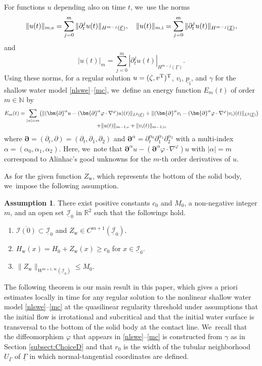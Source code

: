 \documentclass[JEP,XML,SOM,Unicode,NoFloatCountersInSection,published]{cedram}
\newenvironment{enumeratei}
{\bgroup\def\theenumi{\roman{enumi}}\def\theenumii{\arabic{enumii}}\begin{enumerate}}
{\end{enumerate}\egroup}
\newcommand{\R}{{\mathbb R}}
\newcommand{\dt}{\partial_t}
\newcommand{\cI}{{\mathcal I}}
\newcommand{\cE}{{\mathcal E}}
\newcommand{\ul}[1]{\underline{#1}}
\newcommand{\itGamma}{\mathit{\Gamma}}
\theoremstyle{definition}
\newtheorem{assumption}[theorem]{Assumption}
\begin{document}
For functions $u$ depending also on time $t$, we~use the norms
\[
\|u(t)\|_{m,{\rm e}}=\sum_{j=0}^m \|\dt^j u (t)\|_{H^{m-j}(\ul{\cE})}, \quad
\|u(t)\|_{m,{\rm i}}=\sum_{j=0}^m \|\dt^j u (t)\|_{H^{m-j}(\ul{\cI})},
\]
and
\[
|u(t)|_m = \sum_{j=0}^m |\dt^j u(t)|_{H^{m-j}(\ul{\itGamma})}.
\]
Using these norms, for a regular solution $u=(\zeta,v^{\rm T})^{\rm T}$, $v_\mathrm{i}$, $\ul{p}_\mathrm{i}$, and $\gamma$ for the shallow water model
\eqref{nlswe}--\eqref{mc}, we~define an energy function $E_m(t)$ of order $m\in\mathbb{N}$ by
\begin{multline*}
E_m(t)
= \sum_{|\alpha|=m} \bigl(\|(\bm{\partial}^\alpha u-(\bm{\partial}^\alpha\varphi\cdot\nabla^\varphi)u)(t)\|_{L^2(\ul{\cE})}
+ \|(\bm{\partial}^\alpha v_\mathrm{i}-(\bm{\partial}^\alpha\varphi\cdot\nabla^\varphi)v_\mathrm{i})(t)\|_{L^2(\ul{\cI})} \bigr) \\[-5pt]
+ \|u(t)\|_{m-1,{\rm e}} + \|v_\mathrm{i}(t)\|_{m-1,{\rm i}},
\end{multline*}
where $\bm{\partial}=(\dt,\partial)=(\dt,\partial_1,\partial_2)$ and $\bm{\partial}^\alpha=\dt^{\alpha_0}\partial_1^{\alpha_1}\partial_2^{\alpha_2}$
with a multi-index $\alpha=(\alpha_0,\alpha_1,\alpha_2)$.
Here, we~note that $\bm{\partial}^\alpha u-(\bm{\partial}^\alpha\varphi\cdot\nabla^\varphi)u$ with $|\alpha|=m$ correspond to Alinhac's good unknowns
for the $m$-th order derivatives of $u$.

As for the given function $Z_\mathrm{w}$, which represents the bottom of the solid body, we~impose the following assumption.

\begin{assumption}\label{ass:BSB}
There exist positive constants $c_0$ and $M_0$, a non-negative integer $m$, and an open set $\ul{\cI}_{0}$ in $\R^2$ such that the followings hold.
\begin{enumeratei}
\item\label{ass:BSBi}
$\overline{\cI(0)}\subset\ul{\cI}_{0}$ and $Z_\mathrm{w} \in C^{m+1}(\overline{\ul{\cI}_0})$.
\item\label{ass:BSBii}
$H_\mathrm{w}(x)=H_0+Z_\mathrm{w}(x) \geq c_0$ for $x\in\ul{\cI}_0$.
\item\label{ass:BSBiii}
$\|Z_\mathrm{w}\|_{W^{m+1,\infty}(\ul{\cI}_0)} \leq M_0$.
\end{enumeratei}
\end{assumption}

The following theorem is our main result in this paper, which gives a priori estimates locally in time for any regular solution to the nonlinear shallow water model
\eqref{nlswe}--\eqref{mc} at the quasilinear regularity threshold under assumptions that the initial flow is irrotational and subcritical
and that the initial water surface is transversal to the bottom of the solid body at the contact line. We~recall that the diffeomorphism $\varphi$ that appears in \eqref{nlswe}--\eqref{mc} is constructed from $\gamma$ as in Section \ref{subsect:ChoiceD}
and that $r_0$ is the width of the tubular neighborhood $U_{\ul{\itGamma}}$ of $\ul{\itGamma}$ in which normal-tangential coordinates are defined.
\end{document}
